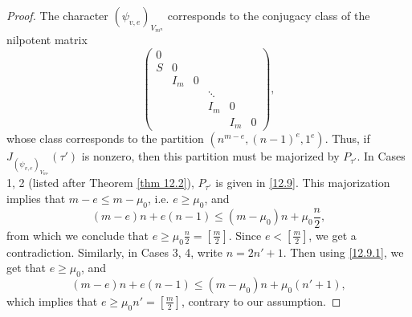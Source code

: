 \documentclass[12pts]{amsart}
\begin{document}
\begin{proof}	
The character $(\psi_{v,e})_{V_{m^n}}$ corresponds to the conjugacy class of the nilpotent matrix
$$
\begin{pmatrix}0\\S&0\\&I_m&0\\&&&\ddots\\&&&I_m&0\\&&&&I_m&0\end{pmatrix},
$$
whose class corresponds to the partition $(n^{m-e}, (n-1)^e, 1^e)$. Thus, if $J_{(\psi_{v,e})_{V_{m^n}}}(\tau')$ is nonzero, then  this partition must be majorized by $P_{\tau'}$. In Cases 1, 2 (listed after Theorem \ref{thm 12.2}), $P_{\tau'}$ is given in \eqref{12.9}. This majorization implies that $m-e\leq m-\mu_0$, i.e. $e\geq \mu_0$, and
	$$
	(m-e)n+e(n-1)\leq (m-\mu_0)n+\mu_0\frac{n}{2},
	$$
	from which we conclude that $e\geq \mu_0\frac{n}{2}=[\frac{m}{2}]$. Since $e<[\frac{m}{2}]$, we get a contradiction. Similarly, in Cases 3, 4, write $n=2n'+1$. Then using \eqref{12.9.1}, we get that $e\geq \mu_0$, and
	$$
	(m-e)n+e(n-1)\leq (m-\mu_0)n+\mu_0(n'+1),
	$$ 
which implies that $e\geq \mu_0n'=[\frac{m}{2}]$, contrary to our assumption.	
\end{proof}
\end{document}
